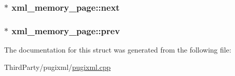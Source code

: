 \hypertarget{structxml__memory__page_a326a74e009af80219ea31bc65ed9e45e}{
\subsubsection[{next}]{$\ast$ xml\-\_\-memory\-\_\-page\-::next}}\label{structxml__memory__page_a326a74e009af80219ea31bc65ed9e45e}
\hypertarget{structxml__memory__page_a014969b0e4a34a6cb24e9823791e60ab}{
\subsubsection[{prev}]{$\ast$ xml\-\_\-memory\-\_\-page\-::prev}}\label{structxml__memory__page_a014969b0e4a34a6cb24e9823791e60ab}


The documentation for this struct was generated from the following file\-:\begin{DoxyCompactItemize}
\item 
Third\-Party/pugixml/\hyperlink{pugixml_8cpp}{pugixml.\-cpp}\end{DoxyCompactItemize}
